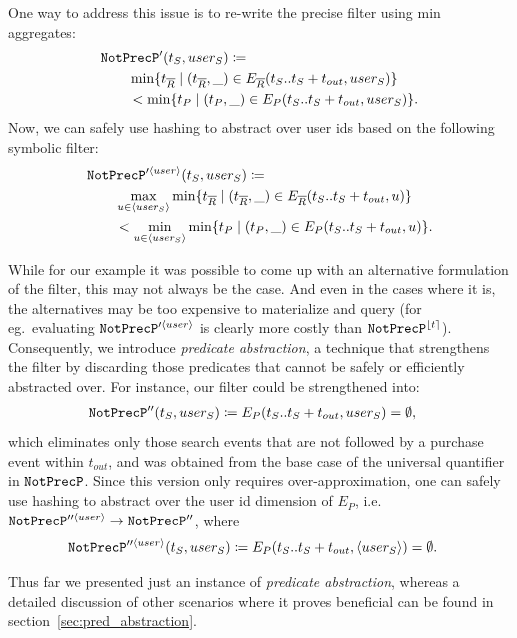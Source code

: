 One way to address this issue is to re-write the precise filter using min
aggregates:
\begin{align*}
&
\texttt{NotPrecP}'(t_S, user_S) \coloneq 
\\
&\qquad
\min \{ t_{\overline{R}} \mid (t_{\overline{R}}, \_) \in E_{\overline{R}}(t_S..t_S + t_{out}, user_S) \}
\\
&\qquad
< \min \{ t_P \mid (t_P, \_) \in E_P(t_S..t_S + t_{out}, user_S) \}.
\end{align*}
Now, we can safely use hashing to abstract over user ids based on the following
symbolic filter:
\begin{align*}
&
\texttt{NotPrecP}'^{\langle user \rangle}(t_S, user_S) \coloneq 
\\
&\qquad
\max_{u \in \langle user_S \rangle}
\min \{ t_{\overline{R}} \mid (t_{\overline{R}}, \_) \in E_{\overline{R}}(t_S..t_S + t_{out}, u) \}
\\
&\qquad
< 
\min_{u \in \langle user_S \rangle}
\min \{ t_P \mid (t_P, \_) \in E_P(t_S..t_S + t_{out}, u) \}.
\end{align*}


While for our example it was possible to come up with an alternative formulation
of the filter, this may not always be the case. 
And even in the cases where it is, the alternatives may be too expensive to
materialize and query (for eg.\ evaluating $\texttt{NotPrecP}'^{\langle user \rangle}$ is
clearly more costly than $\texttt{NotPrecP}^{\lfloor t \rceil}$).
Consequently, 
we introduce {\em predicate abstraction}, a technique
that strengthens the filter by discarding those predicates that cannot be safely
or efficiently abstracted over.
For instance, our filter could be strengthened into:
\begin{align*}
&
\texttt{NotPrecP}''(t_S, user_S) \coloneq 
E_P(t_S..t_S + t_{out}, user_S) = \emptyset,
\end{align*} 
which eliminates only those search events that are not followed by a purchase
event within $t_{out}$, and was obtained from the base case of
the universal quantifier in $\texttt{NotPrecP}$.
Since this version only requires over-approximation, one can safely use hashing
to abstract over the user id dimension of $E_P$, i.e.\ 
$\texttt{NotPrecP}''^{\langle user \rangle} \rightarrow \texttt{NotPrecP}''$, where
\begin{align*}
&
\texttt{NotPrecP}''^{\langle user \rangle}(t_S, user_S) \coloneq 
E_P(t_S..t_S + t_{out}, \langle user_S \rangle) = \emptyset .
\end{align*}


Thus far we presented just an instance of {\em predicate abstraction}, whereas a
detailed discussion of other scenarios where it proves beneficial can be found
in section~\ref{sec:pred_abstraction}.




